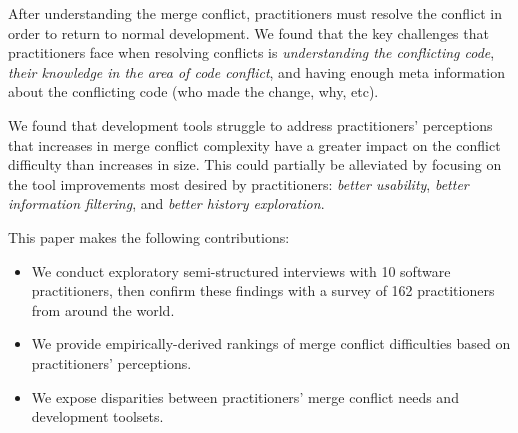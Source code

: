 After understanding the merge conflict, practitioners must resolve the conflict in order to return to normal development.
We found that the key challenges that practitioners face when resolving conflicts is \textit{understanding the conflicting code}, \textit{their knowledge in the area of code conflict}, and having enough meta information about the conflicting code (who made the change, why, etc).

We found that development tools struggle to address practitioners' perceptions that increases in merge conflict complexity have a greater impact on the conflict difficulty  than increases in size.
This could partially be alleviated by focusing on the tool improvements most desired by practitioners: \textit{better usability}, \textit{better information filtering}, and \textit{better history exploration}.


This paper makes the following contributions:
\begin{itemize}
\item We conduct exploratory semi-structured interviews with 10 software practitioners, then confirm these findings with a survey of 162 practitioners from around the world.
\item We provide empirically-derived rankings of merge conflict difficulties based on practitioners' perceptions.
\item We expose disparities between practitioners' merge conflict needs and development toolsets.
\end{itemize}